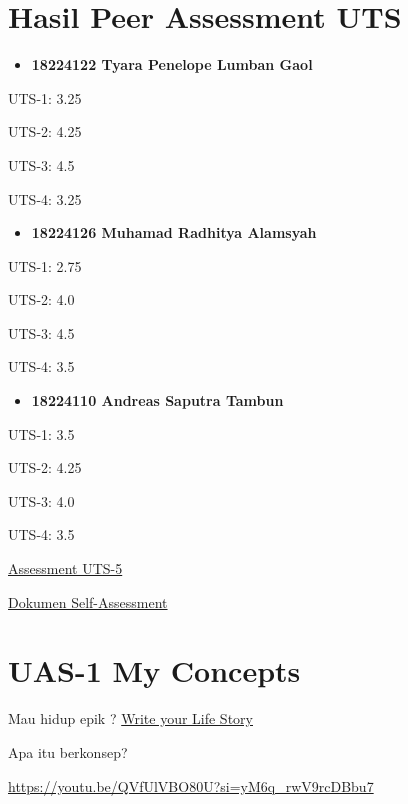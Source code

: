 \documentclass[
  letterpaper,
  DIV=11,
  numbers=noendperiod]{scrreprt}
\providecommand{\tightlist}{%
  \setlength{\itemsep}{0pt}\setlength{\parskip}{0pt}}
\begin{document}

\chapter{Hasil Peer Assessment UTS}\label{hasil-peer-assessment-uts}

\begin{itemize}
\tightlist
\item
  \textbf{18224122 Tyara Penelope Lumban Gaol}
\end{itemize}

UTS-1: 3.25

UTS-2: 4.25

UTS-3: 4.5

UTS-4: 3.25

\begin{itemize}
\tightlist
\item
  \textbf{18224126 Muhamad Radhitya Alamsyah}
\end{itemize}

UTS-1: 2.75

UTS-2: 4.0

UTS-3: 4.5

UTS-4: 3.5

\begin{itemize}
\tightlist
\item
  \textbf{18224110 Andreas Saputra Tambun}
\end{itemize}

UTS-1: 3.5

UTS-2: 4.25

UTS-3: 4.0

UTS-4: 3.5

\href{UTS-5_Skor.xlsx}{Assessment UTS-5}

\href{Self-Assessment\%20UTS-1\%20sampai\%20UTS-5\%20-\%20Daniel\%20W.G_.pdf}{Dokumen
Self-Assessment}


\chapter{UAS-1 My Concepts}\label{uas-1-my-concepts}

Mau hidup epik ? \href{lifestory.pdf}{Write your Life Story}

Apa itu berkonsep?

\url{https://youtu.be/QVfUlVBO80U?si=yM6q_rwV9rcDBbu7}

\end{document}
